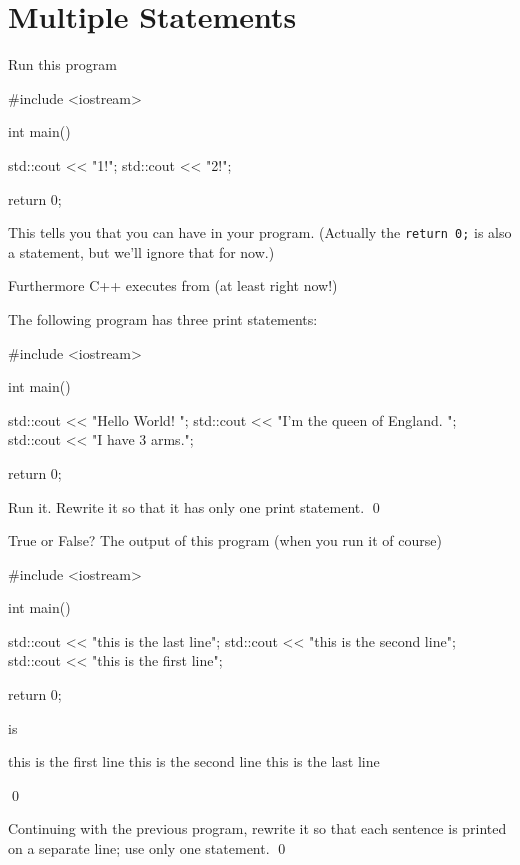 \newpage\section{Multiple Statements}
\begin{ex}
Run this program
\begin{console}
#include <iostream>

int main()
{
    std::cout << "1!\n";
    std::cout << "2!\n";

    return 0;
}
\end{console}
\end{ex}


This tells you that you can have 
in your program. (Actually the \verb!return 0;! is also a statement, but we'll ignore that for now.)

Furthermore C++ executes from 
(at least right now!)

\begin{ex}
The following program has three print statements: 
\begin{console}
#include <iostream>

int main()
{
    std::cout << "Hello World! ";
    std::cout << "I'm the queen of England. ";
    std::cout << "I have 3 arms.";

    return 0;
}
\end{console}
Run it. Rewrite it so that it has only one print statement. 
\qed
\end{ex}


\begin{ex}
True or False? The output of this program (when you run it of course)
\begin{console}
#include <iostream>

int main()
{
    std::cout << "this is the last line\n";
    std::cout << "this is the second line\n";
    std::cout << "this is the first line\n";

    return 0;
}
\end{console}
is
\begin{console}
this is the first line
this is the second line
this is the last line
\end{console}
\qed
\end{ex}


\begin{ex}
Continuing with the previous program, 
rewrite it so that each sentence is printed on a separate line; use only one statement.
\qed
\end{ex}



